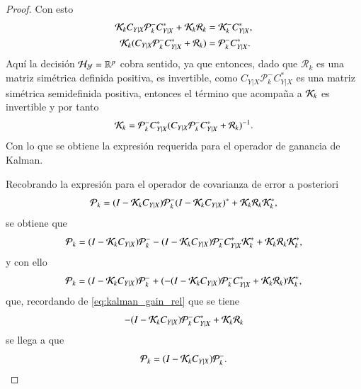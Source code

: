 \begin{proof}
Con esto
\begin{align*}
\mathcal{K}_k C_{Y|X}\mathcal{P}^-_{k}C_{Y|X}^* + \mathcal{K}_k \mathcal{R}_k &= \mathcal{K}^-_{k}C_{Y|X}^*, \\
\mathcal{K}_k(C_{Y|X}\mathcal{P}^-_{k}C_{Y|X}^* + \mathcal{R}_k) &= \mathcal{P}^-_{k}C_{Y|X}^* .
\end{align*}
Aquí la decisión $\mathcal{H}_{\mathcal{Y}} = \mathbb{R}^p$ cobra sentido, ya que entonces, dado que $\mathcal{R}_k$ es una matriz simétrica definida positiva, es invertible, como $C_{Y|X}\mathcal{P}^-_{k}C_{Y|X}^*$ es una matriz simétrica semidefinida positiva, entonces el término que acompaña a $\mathcal{K}_k$ es invertible y por tanto
\begin{equation*} 
\mathcal{K}_k = \mathcal{P}^-_{k}C_{Y|X}^*(C_{Y|X}\mathcal{P}^-_{k}C_{Y|X}^* + \mathcal{R}_k)^{-1}.
\end{equation*}
Con lo que se obtiene la expresión requerida para el operador de ganancia de Kalman. 

Recobrando la expresión para el operador de covarianza de error a posteriori
\begin{equation*}
\mathcal{P}_k = (I - \mathcal{K}_k C_{Y|X})\mathcal{P}^-_{k}(I - \mathcal{K}_k C_{Y|X})^* + \mathcal{K}_k \mathcal{R}_k \mathcal{K}_k^*,
\end{equation*}
se obtiene que
\begin{equation*}
\mathcal{P}_k = (I - \mathcal{K}_k C_{Y|X})\mathcal{P}^-_{k} - (I - \mathcal{K}_k C_{Y|X})\mathcal{P}^-_{k} C_{Y|X}^* \mathcal{K}_k^* + \mathcal{K}_k \mathcal{R}_k \mathcal{K}_k^*,
\end{equation*}
y con ello
\begin{equation*}
\mathcal{P}_k = (I - \mathcal{K}_k C_{Y|X})\mathcal{P}^-_{k} + (-(I - \mathcal{K}_k C_{Y|X})\mathcal{P}^-_{k} C_{Y|X}^*  + \mathcal{K}_k \mathcal{R}_k) \mathcal{K}_k^*,
\end{equation*}
que, recordando de \eqref{eq:kalman_gain_rel} que se tiene
\begin{equation*}
    -(I - \mathcal{K}_k C_{Y|X})\mathcal{P}^-_{k} C_{Y|X}^*  + \mathcal{K}_k \mathcal{R}_k
\end{equation*}
se llega a que
\begin{equation*}
    \mathcal{P}_k = (I - \mathcal{K}_k C_{Y|X})\mathcal{P}^-_{k}.
\end{equation*}
\end{proof}


